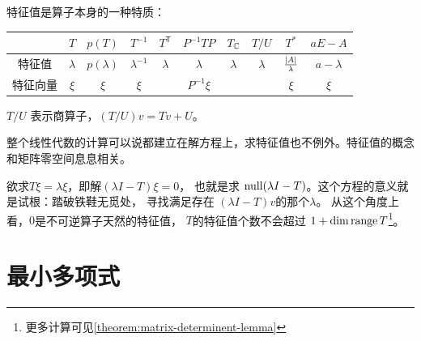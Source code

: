特征值是算子本身的一种特质：
\begin{table}[htbp]
    \centering
    \begin{tabular}{cccccccccc}
        \hline
        & \(T\) & \(p(T)\) & \(T^{-1}\) & \(T^{\mathsf{T}}\) & \(P^{-1}TP\) & \(T_{\mathbb{C}}\) & \(T/U\) & \(T^*\) & \(aE - A\)\\
        \hline
        特征值 & \(\lambda\) & \(p(\lambda)\) & \(\lambda^{-1}\) & \(\lambda\) & \(\lambda\) & \(\lambda\) & \(\lambda\) & \(\tfrac{\left|A\right|}{\lambda}\) & \(a-\lambda\)\\
        特征向量 & \(\xi\) & \(\xi\) & \(\xi\) & & \(P^{-1}\xi\) & & & \(\xi\) & \(\xi\)\\
        \hline
    \end{tabular}
\end{table}
\(T/U\) 表示商算子，\((T/U)v=Tv+U\)。

整个线性代数的计算可以说都建立在解方程上，求特征值也不例外。特征值的概念和矩阵零空间息息相关。

欲求\(T\xi = \lambda\xi\)，即解\((\lambda I - T)\xi = 0\)，
也就是求 \(\operatorname{null}(\lambda I - T)\)。这个方程的意义就是试根：踏破铁鞋无觅处，
寻找满足存在 \((\lambda I - T)v\)的那个\(\lambda \)。
从这个角度上看，\(0\)是不可逆算子天然的特征值，
\(T\)的特征值个数不会超过 \(1+\dim \operatorname{range} T\)\footnote{更多计算可见\cref{theorem:matrix-determinent-lemma}}。

\section{最小多项式}




